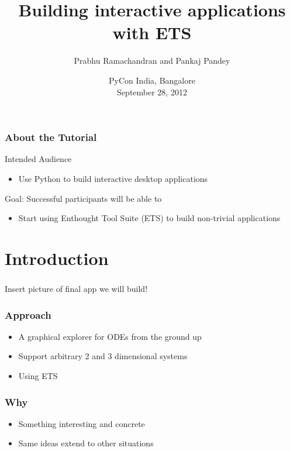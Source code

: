 \documentclass[14pt,compress]{beamer}
\title[ETS]{Building interactive applications with ETS}
\author[Prabhu and Pankaj] {Prabhu Ramachandran and Pankaj Pandey}
\institute[Enthought] {\large \pgfimage[height=3em]{enthought-logo_lg}
}
\date[] {
\small
PyCon India, Bangalore\\
September 28, 2012
}
\begin{document}
\begin{frame}
  \maketitle
\end{frame}


\begin{frame}
  \frametitle{About the Tutorial}
  \begin{block}{Intended Audience}
  \begin{itemize}
    \item Use Python to build interactive desktop applications
  \end{itemize}
  \end{block}  

  \begin{block}{Goal: Successful participants will be able to}
    \begin{itemize}
      \item Start using Enthought Tool Suite (ETS) to build non-trivial applications

    \end{itemize}
  \end{block}
\end{frame}

\section{Introduction}

\begin{frame}
  \frametitle{}
  \begin{center}
      Insert picture of final app we will build!
  \end{center}
\end{frame}

\begin{frame}
  \frametitle{Approach}
  \begin{itemize}
      \item A graphical explorer for ODEs \alert{from the ground up}
  \item Support arbitrary 2 and 3 dimensional systems
  \item Using ETS
 \end{itemize}
\end{frame}

\begin{frame}
  \frametitle{Why}
  \begin{itemize}
  \item Something interesting and concrete
  \item Same ideas extend to other situations
 \end{itemize}
\end{frame}
\end{document}

